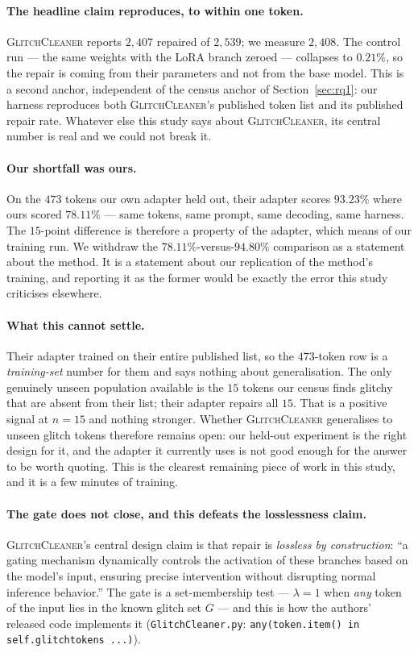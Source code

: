 \documentclass[11pt,a4paper]{article}
\newcommand{\gc}{\textsc{GlitchCleaner}}
\begin{document}
\paragraph{The headline claim reproduces, to within one token.} \gc{} reports
$2{,}407$ repaired of $2{,}539$; we measure $2{,}408$. The control run --- the same
weights with the LoRA branch zeroed --- collapses to $0.21\%$, so the repair is
coming from their parameters and not from the base model. This is a second anchor,
independent of the census anchor of Section~\ref{sec:rq1}: our harness reproduces
both \gc{}'s published token list and its published repair rate. Whatever else
this study says about \gc{}, its central number is real and we could not break it.

\paragraph{Our shortfall was ours.} On the $473$ tokens our own adapter held out,
their adapter scores $93.23\%$ where ours scored $78.11\%$ --- same tokens, same
prompt, same decoding, same harness. The $15$-point difference is therefore a
property of the adapter, which means of our training run. We withdraw the
$78.11\%$-versus-$94.80\%$ comparison as a statement about the method. It is a
statement about our replication of the method's training, and reporting it as the
former would be exactly the error this study criticises elsewhere.

\paragraph{What this cannot settle.} Their adapter trained on their entire
published list, so the $473$-token row is a \emph{training-set} number for them
and says nothing about generalisation. The only genuinely unseen population
available is the $15$ tokens our census finds glitchy that are absent from their
list; their adapter repairs all $15$. That is a positive signal at $n = 15$ and
nothing stronger. Whether \gc{} generalises to unseen glitch tokens therefore
remains open: our held-out experiment is the right design for it, and the adapter
it currently uses is not good enough for the answer to be worth quoting. This is
the clearest remaining piece of work in this study, and it is a few minutes of
training.

\paragraph{The gate does not close, and this defeats the losslessness claim.}
\gc{}'s central design claim is that repair is \emph{lossless by construction}:
``a gating mechanism dynamically controls the activation of these branches based
on the model's input, ensuring precise intervention without disrupting normal
inference behavior.'' The gate is a set-membership test --- $\lambda = 1$ when
\emph{any} token of the input lies in the known glitch set $G$ --- and this is how
the authors' released code implements it
(\texttt{GlitchCleaner.py}: \texttt{any(token.item() in self.glitchtokens ...)}).
\end{document}
